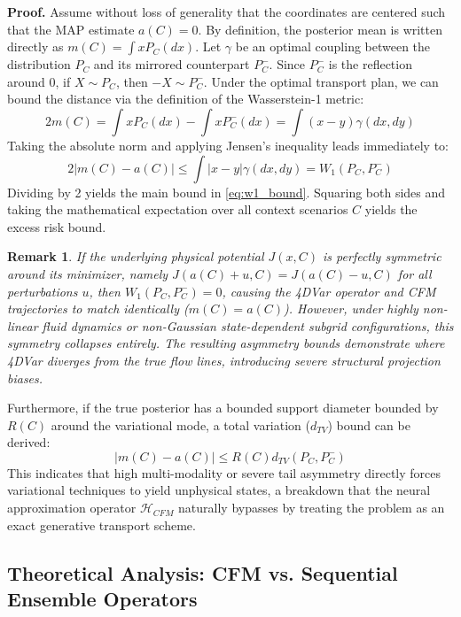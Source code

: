\documentclass[10pt]{article}
\newtheorem{remark}{Remark}
\begin{document}
{\bf Proof.} Assume without loss of generality that the coordinates are centered such that the MAP estimate $a(C) = 0$. By definition, the posterior mean is written directly as $m(C) = \int x P_{C}(dx)$. Let $\gamma$ be an optimal coupling between the distribution $P_{C}$ and its mirrored counterpart $P_{C}^{-}$. Since $P_{C}^{-}$ is the reflection around $0$, if $X \sim P_{C}$, then $-X \sim P_{C}^{-}$. Under the optimal transport plan, we can bound the distance via the definition of the Wasserstein-1 metric:
\begin{equation}
    2m(C) = \int x P_{C}(dx) - \int x P_{C}^{-}(dx) = \int (x - y) \gamma(dx, dy)
\end{equation}
Taking the absolute norm and applying Jensen's inequality leads immediately to:
\begin{equation}
    2|m(C) - a(C)| \le \int |x - y| \gamma(dx, dy) = W_{1}(P_{C}, P_{C}^{-})
\end{equation}
Dividing by 2 yields the main bound in \eqref{eq:w1_bound}. Squaring both sides and taking the mathematical expectation over all context scenarios $C$ yields the excess risk bound.

\begin{remark}
If the underlying physical potential $J(x, C)$ is perfectly symmetric around its minimizer, namely $J(a(C) + u, C) = J(a(C) - u, C)$ for all perturbations $u$, then $W_{1}(P_{C}, P_{C}^{-}) = 0$, causing the 4DVar operator and CFM trajectories to match identically ($m(C) = a(C)$). However, under highly non-linear fluid dynamics or non-Gaussian state-dependent subgrid configurations, this symmetry collapses entirely. The resulting asymmetry bounds demonstrate where 4DVar diverges from the true flow lines, introducing severe structural projection biases.
\end{remark}

Furthermore, if the true posterior has a bounded support diameter bounded by $R(C)$ around the variational mode, a total variation ($d_{TV}$) bound can be derived:
\begin{equation}
    |m(C) - a(C)| \le R(C)d_{TV}(P_{C}, P_{C}^{-}) \label{eq:tv_bound}
\end{equation}
This indicates that high multi-modality or severe tail asymmetry directly forces variational techniques to yield unphysical states, a breakdown that the neural approximation operator $\mathcal{H}_{CFM}$ naturally bypasses by treating the problem as an exact generative transport scheme.
\fi

\iffalse
\subsection{Theoretical Analysis: CFM vs. Sequential Ensemble Operators}
\end{document}
